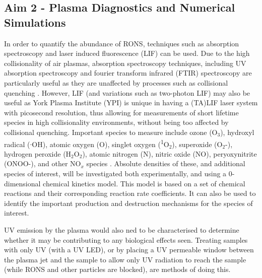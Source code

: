 \documentclass[11pt, oneside]{article}   	%
\begin{document}
\subsection*{Aim 2 - Plasma Diagnostics and Numerical Simulations}
In order to quantify the abundance of RONS, techniques such as absorption spectroscopy and laser induced fluorescence (LIF) can be used. 
Due to the high collisionality of air plasmas, absorption spectroscopy techniques, including UV absorption spectroscopy and fourier transform infrared (FTIR) spectroscopy are particularly useful as they are unaffected by processes such as collisional quenching \cite{Niemi2013absolute, Schroter2015atomic}.
However, LIF (and variations such as two-photon LIF) may also be useful as York Plasma Institute (YPI) is unique in having a (TA)LIF laser system with picosecond resolution, thus allowing for measurements of short lifetime species in high collisionality environments, without being too affected by collisional quenching.
Important species to measure include ozone (O$_3$),  hydroxyl radical ($\cdot$OH), atomic oxygen (O), singlet oxygen (\textsuperscript{1}O$_2$), superoxide (O$_2$-), hydrogen peroxide (H$_2$O$_2$),  atomic nitrogen (N), nitric oxide (NO), peryoxynitrite (ONOO-), and other NO$_x$ species \cite{Graves2014low}. 
Absolute densities of these, and additional species of interest, will be investigated both experimentally, and using a 0-dimensional chemical kinetics model. This model is based on a set of chemical reactions and their corresponding reaction rate coefficients. It can also be used to identify the important production and destruction mechanisms for the species of interest.

UV emission by the plasma would also ned to be characterised to determine whether it may be contributing to any biological effects seen.
Treating samples with only UV (with a UV LED), or by placing a UV permeable window between the plasma jet and the sample to allow only UV radiation to reach the sample (while RONS and other particles are blocked), are methods of doing this.
\end{document}
